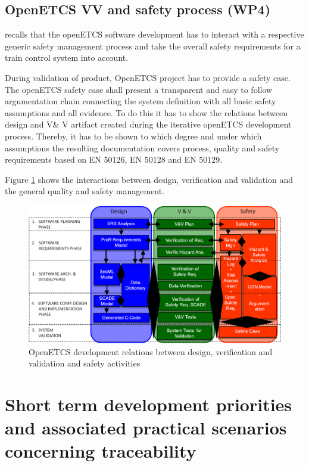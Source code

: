 \documentclass[11pt]{template/openetcs_report}
\begin{document}
\section{OpenETCS VV and safety process (WP4)}


\cite{D4.2.3} recalls that the openETCS software development has to interact with a respective generic safety management process and take the overall safety requirements for a train control system into account. 

During validation of product, OpenETCS project has to provide a safety case. 
The openETCS safety case shall present a transparent and easy to follow argumentation chain
connecting the system definition with all basic safety assumptions and all evidence. To do this it
has to show the relations between design and V\& V artifact created during the iterative openETCS
development process. Thereby, it has to be shown to which degree and under which assumptions
the resulting documentation covers process, quality and safety requirements based on EN 50126,
EN 50128 and EN 50129.

Figure \ref{fig:SafetyProcess} shows the interactions between design, verification and validation and the general quality and safety management.

\begin{figure}[htbp]
\centering
\includegraphics[width=1\linewidth]{./images/openETCS-Software-Safety-Development.png}
\caption{OpenETCS development relations between design, verification and validation and safety activities}
\label{fig:SafetyProcess}
\end{figure}




\chapter{Short term development priorities and associated practical scenarios concerning traceability}
\end{document}
